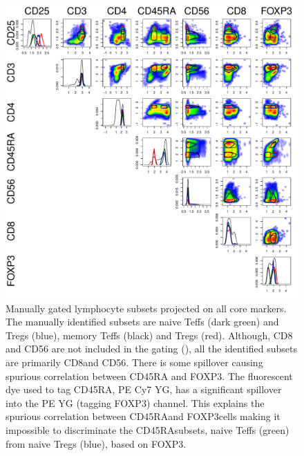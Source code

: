 \begin{figure}
\centering
\includegraphics[width=\linewidth]{figures/lymphocytes-all-markers}
{ Manually gated lymphocyte subsets projected on all core markers.  }
{
    The manually identified subsets are naive Teffs (dark green) and Tregs (blue), memory Teffs (black) and Tregs (red).
    Although, CD8 and CD56 are not included in the gating (), all the identified subsets are primarily CD8\negative and CD56\negative.
    There is some spillover causing spurious correlation between CD45RA and FOXP3.
    The fluorescent dye used to tag CD45RA, PE Cy7 YG, has a significant spillover into the PE YG (tagging FOXP3) channel.
    This explains the spurious correlation between CD45RA\positive and FOXP3\positive cells making it impossible to discriminate
    the CD45RA\positive subsets, naive Teffs (green) from naive Tregs (blue), based on FOXP3.  
}
\end{figure}


